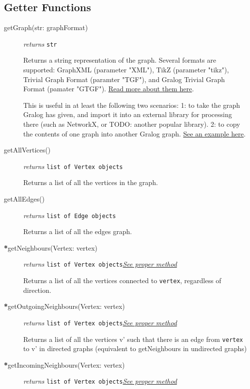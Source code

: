 \documentclass{article}
\newcounter{example}
\newlength\q
\begin{document}
\subsection{Getter Functions}
\begin{description}
\item[getGraph(str: graphFormat)]\emph{returns}
  \texttt{str}

Returns a string representation of the graph. Several formats are supported: GraphXML (parameter "XML"), TikZ (parameter "tikz"), Trivial Graph Format (paramter "TGF"), and Gralog Trivial Graph Format (pamater "GTGF"). \hyperref[graphFormatsInDetail]{Read more about them here}.

This is useful in at least the following two scenarios: 1: to take the graph Gralog has given, and import it into an external library for processing there (such as NetworkX, or TODO: another popular library). 2: to copy the contents of one graph into another Gralog graph. \hyperref[getGraphExample]{See an example here}.


\item[getAllVertices()]\emph{returns}
  \texttt{list of Vertex objects}

Returns a list of all the vertices in the graph.

\item[getAllEdges()]\emph{returns}
  \texttt{list of Edge objects}

Returns a list of all the edges graph.

\item[\textbf{*}getNeighbours(Vertex: vertex)]\emph{returns} \texttt{list of Vertex objects}\quad \hyperref[getNeighboursClass]{\textit{See proper method}}

Returns a list of all the vertices connected to \texttt{vertex}, regardless of direction.

\item[\textbf{*}getOutgoingNeighbours(Vertex: vertex)]\emph{returns} \texttt{list of Vertex objects}\quad \hyperref[getOutgoingNeighboursClass]{\textit{See proper method}}

Returns a list of all the vertices v' such that there is an edge from \texttt{vertex} to v' in directed graphs (equivalent to getNeighbours in undirected graphs)

\item[\textbf{*}getIncomingNeighbours(Vertex: vertex)]\emph{returns} \texttt{list of Vertex objects}\quad \hyperref[getIncomingNeighboursClass]{\textit{See proper method}}


\end{description}
\end{document}
